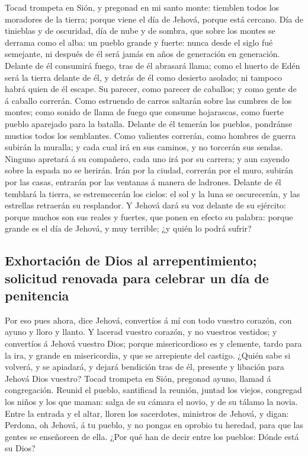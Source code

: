  Tocad trompeta en Sión, y pregonad en mi santo monte:
tiemblen todos los moradores de la tierra; porque viene el día de
Jehová, porque está cercano.  Día de tinieblas y de
oscuridad, día de nube y de sombra, que sobre los montes se derrama como
el alba: un pueblo grande y fuerte: nunca desde el siglo fué semejante,
ni después de él será jamás en años de generación en generación.
 Delante de él consumirá fuego, tras de él abrasará llama;
como el huerto de Edén será la tierra delante de él, y detrás de él como
desierto asolado; ni tampoco habrá quien de él escape.  Su
parecer, como parecer de caballos; y como gente de á caballo correrán.
 Como estruendo de carros saltarán sobre las cumbres de los
montes; como sonido de llama de fuego que consume hojarascas, como
fuerte pueblo aparejado para la batalla.  Delante de él
temerán los pueblos, pondránse mustios todos los semblantes.
 Como valientes correrán, como hombres de guerra subirán la
muralla; y cada cual irá en sus caminos, y no torcerán sus sendas.
 Ninguno apretará á su compañero, cada uno irá por su
carrera; y aun cayendo sobre la espada no se herirán.  Irán
por la ciudad, correrán por el muro, subirán por las casas, entrarán por
las ventanas á manera de ladrones.  Delante de él temblará
la tierra, se estremecerán los cielos: el sol y la luna se oscurecerán,
y las estrellas retraerán su resplandor.  Y Jehová dará su
voz delante de su ejército: porque muchos son sus reales y fuertes, que
ponen en efecto su palabra: porque grande es el día de Jehová, y muy
terrible; ¿y quién lo podrá sufrir?

\hypertarget{exhortaciuxf3n-de-dios-al-arrepentimiento-solicitud-renovada-para-celebrar-un-duxeda-de-penitencia}{%
\subsection{Exhortación de Dios al arrepentimiento; solicitud renovada
para celebrar un día de
penitencia}\label{exhortaciuxf3n-de-dios-al-arrepentimiento-solicitud-renovada-para-celebrar-un-duxeda-de-penitencia}}

 Por eso pues ahora, dice Jehová, convertíos á mí con todo
vuestro corazón, con ayuno y lloro y llanto.  Y lacerad
vuestro corazón, y no vuestros vestidos; y convertíos á Jehová vuestro
Dios; porque misericordioso es y clemente, tardo para la ira, y grande
en misericordia, y que se arrepiente del castigo.  ¿Quién
sabe si volverá, y se apiadará, y dejará bendición tras de él, presente
y libación para Jehová Dios vuestro?  Tocad trompeta en
Sión, pregonad ayuno, llamad á congregación.  Reunid el
pueblo, santificad la reunión, juntad los viejos, congregad los niños y
los que maman: salga de su cámara el novio, y de su tálamo la novia.
 Entre la entrada y el altar, lloren los sacerdotes,
ministros de Jehová, y digan: Perdona, oh Jehová, á tu pueblo, y no
pongas en oprobio tu heredad, para que las gentes se enseñoreen de ella.
¿Por qué han de decir entre los pueblos: Dónde está su Dios?

